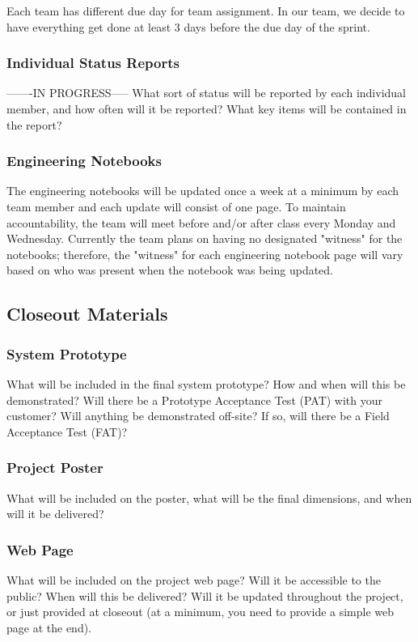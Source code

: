 Each team has different due day for team assignment. In our team, we decide to have everything get done at least 3 days before the due day of the sprint.

\subsubsection{Individual Status Reports}
-------IN PROGRESS-----
What sort of status will be reported by each individual member, and how often will it be reported? What key items will be contained in the report?

\subsubsection{Engineering Notebooks}
The engineering notebooks will be updated once a week at a minimum by each team member and each update will consist of one page. To maintain accountability, the team will meet before and/or after class every Monday and Wednesday. Currently the team plans on having no designated "witness" for the notebooks; therefore, the "witness" for each engineering notebook page will vary based on who was present when the notebook was being updated.

\subsection{Closeout Materials}

\subsubsection{System Prototype}
What will be included in the final system prototype? How and when will this be demonstrated? Will there be a Prototype Acceptance Test (PAT) with your customer? Will anything be demonstrated off-site? If so, will there be a Field Acceptance Test (FAT)?

\subsubsection{Project Poster}
What will be included on the poster, what will be the final dimensions, and when will it be delivered?

\subsubsection{Web Page}
What will be included on the project web page? Will it be accessible to the public? When will this be delivered? Will it be updated throughout the project, or just provided at closeout (at a minimum, you need to provide a simple web page at the end).

